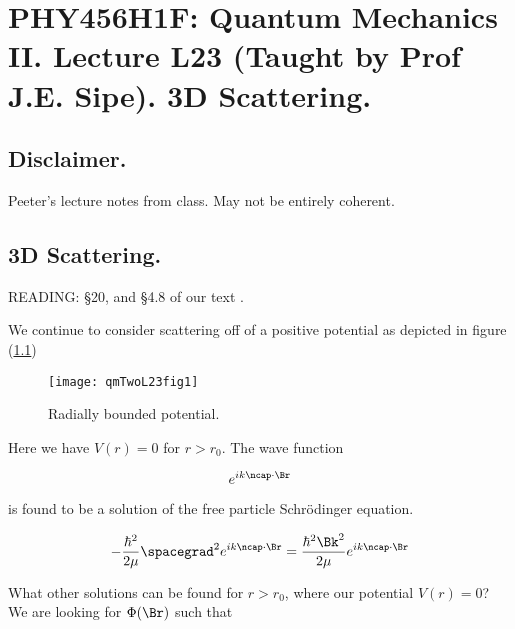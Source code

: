 
%

\chapter{PHY456H1F: Quantum Mechanics II.  Lecture L23 (Taught by Prof J.E. Sipe).  3D Scattering.}
\label{chap:qmTwoL23}
{}
\date{Nov 30, 2011}

\beginArtWithToc

\section{Disclaimer.}

Peeter's lecture notes from class.  May not be entirely coherent.

\section{3D Scattering.}

READING: \S 20, and \S 4.8 of our text \cite{desai2009quantum}.

We continue to consider scattering off of a positive potential as depicted in figure (\ref{fig:qmTwoL23:qmTwoL23fig1})
\begin{figure}[htp]
   \centering
   \texttt{[image: qmTwoL23fig1]}
   \caption{Radially bounded potential.}\label{fig:qmTwoL23:qmTwoL23fig1}
\end{figure}

Here we have $V(r) = 0$ for $r > r_0$.  The wave function

\begin{equation}\label{eqn:qmTwoL23:20}
e^{i k \ncap \cdot \Br}
\end{equation}

is found to be a solution of the free particle Schr\"{o}dinger equation.

\begin{equation}\label{eqn:qmTwoL23:40}
- \frac{\hbar^2}{2\mu} \spacegrad^2
e^{i k \ncap \cdot \Br}
 = \frac{\hbar^2 \Bk^2}{2 \mu}
e^{i k \ncap \cdot \Br}
\end{equation}

What other solutions can be found for $r > r_0$, where our potential $V(r) = 0$?  We are looking for $\Phi(\Br)$ such that

